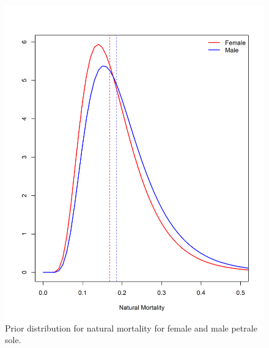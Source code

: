 \documentclass[12pt,]{article}
\begin{document}
\begin{figure}
\centering
\includegraphics{Figures/M_prior.png}
\caption{Prior distribution for natural mortality for female and male
petrale sole. \label{fig:m_prior}}
\end{figure}
\end{document}
